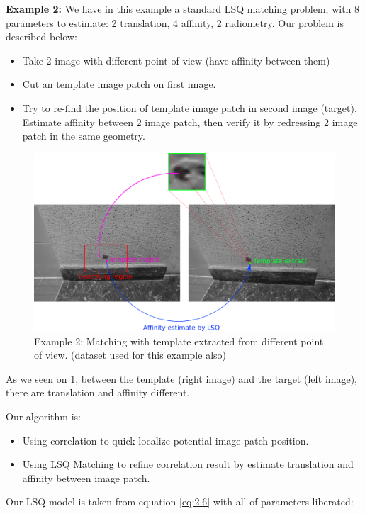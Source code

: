 \documentclass[twoside]{article}
\begin{document}
\textbf{Example 2:} We have in this example a standard LSQ matching problem, with 8 parameters to estimate: 2 translation, 4 affinity, 2 radiometry. Our problem is described below: 

\begin{itemize}
  \item Take 2 image with different point of view (have affinity between them)
  \item Cut an template image patch on first image.
  \item Try to re-find the position of template image patch in second image (target). Estimate affinity between 2 image patch, then verify it by redressing 2 image patch in the same geometry.
\end{itemize}
\begin{figure}[h] 
\includegraphics[width=15cm]{Matching_Temp_Ex2.png}
\caption{Example 2: Matching with template extracted from different point of view. (dataset used for this example also)}
\label{fig:2.3}
\end{figure}

As we seen on \ref{fig:2.3}, between the template (right image) and the target (left image), there are translation and affinity different.

Our algorithm is:
\begin{itemize}
  \item Using correlation to quick localize potential image patch position.
  \item Using LSQ Matching to refine correlation result by estimate translation and affinity between image patch.
\end{itemize}

Our LSQ model is taken from equation \ref{eq:2.6} with all of parameters liberated: 
\end{document}
